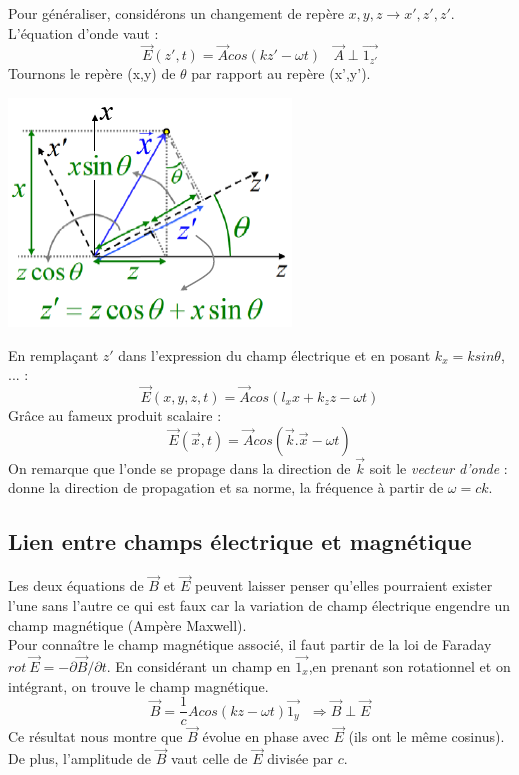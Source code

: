 \documentclass	[11pt, a4paper, openany]{book}
\begin{document}
		Pour généraliser, considérons un changement de repère $x, y, z \rightarrow x', z', z'$. L'équation d'onde vaut :
		\begin{equation}
			\vec{E}(z', t) = \vec{A}cos(kz' - \omega t)\ \ \ \ \vec{A} \perp \vec{1_{z'}}
		\end{equation}
		Tournons le repère (x,y) de $\theta$ par rapport au repère (x',y').
		\begin{center}
			\includegraphics[scale=0.4]{oo/image36.png}
		\end{center}
		En remplaçant $z'$ dans l'expression du champ électrique et en posant $k_x = ksin\theta$, ... :
		\begin{equation}
			\vec{E}(x, y, z, t) = \vec{A}cos(l_x x + k_z z - \omega t)
		\end{equation}
		Grâce au fameux produit scalaire :
		\begin{equation}
			\vec{E} (\vec{x}, t) = \vec{A}cos(\vec{k}.\vec{x} - \omega t)
		\end{equation}
		On remarque que l'onde se propage dans la direction de $\vec{k}$ soit le \textit{vecteur d'onde} : donne la direction de propagation et sa norme, la fréquence à partir de $\omega = ck$.
		
		\subsection{Lien entre champs électrique et magnétique}
		Les deux équations de $\vec{B}$ et $\vec{E}$ peuvent laisser penser qu'elles pourraient exister l'une sans l'autre ce qui est faux car la variation de champ électrique engendre un champ magnétique (Ampère Maxwell).\\
		
		Pour connaître le champ magnétique associé, il faut partir de la loi de Faraday $rot\ \vec{E} = -\partial\vec{B}/\partial t$. En considérant un champ en $\vec{1_x}$,en prenant son rotationnel et on intégrant, on trouve le champ magnétique.
		\begin{equation}
			\vec{B} = \frac{1}{c}Acos(kz - \omega t)\vec{1_y}\ \ \ \Rightarrow \vec{B} \perp \vec{E}
		\end{equation}
		Ce résultat nous montre que $\vec{B}$ évolue en phase avec $\vec{E}$ (ils ont le même cosinus).\\
		De plus, l'amplitude de $\vec{B}$ vaut celle de $\vec{E}$ divisée par $c$.
		
\end{document}
